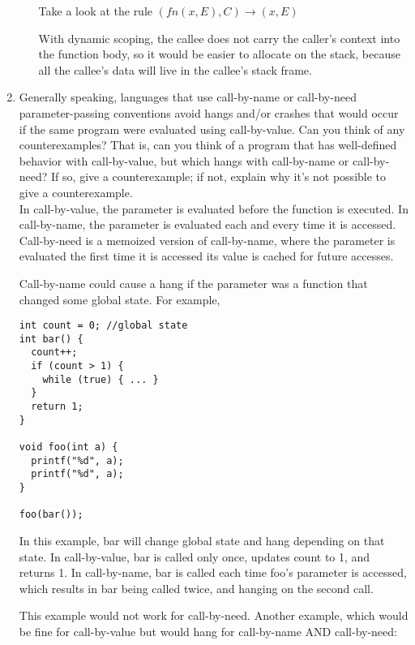 \documentclass[10pt]{article}
\begin{document}
\begin{enumerate}
\begin{enumerate}
                Take a look at the rule \((fn(x,E),C) \rightarrow (x,E)\)

                With dynamic scoping, the callee does not carry the caller's context into the function body, so it would be easier
                to allocate on the stack, because all the callee's data will live in the callee's stack frame.
        \end{enumerate}

        \item Generally speaking, languages that use call-by-name or call-by-need parameter-passing conventions avoid hangs
        and/or crashes that would occur if the same program were evaluated using call-by-value. Can you think of any counterexamples?
        That is, can you think of a program that has well-defined behavior with call-by-value, but which hangs with call-by-name
        or call-by-need? If so, give a counterexample; if not, explain why it's not possible to give a counterexample.\\

        In call-by-value, the parameter is evaluated before the function is executed. In call-by-name, the parameter is evaluated
        each and every time it is accessed. Call-by-need is a memoized version of call-by-name, where the parameter is evaluated
        the first time it is accessed its value is cached for future accesses.

        Call-by-name could cause a hang if the parameter was a function that changed some global state. For example,

\begin{verbatim}
int count = 0; //global state
int bar() {
  count++;
  if (count > 1) {
    while (true) { ... }
  }
  return 1;
}

void foo(int a) {
  printf("%d", a);
  printf("%d", a);
}

foo(bar());
\end{verbatim}

        In this example, bar will change global state and hang depending on that state. In call-by-value, bar is called only once, updates
        count to 1, and returns 1. In call-by-name, bar is called each time foo's parameter is accessed, which results in bar being called twice,
        and hanging on the second call.

        This example would not work for call-by-need. Another example, which would be fine for call-by-value but would hang for call-by-name
        AND call-by-need:


\end{enumerate}
\end{document}
